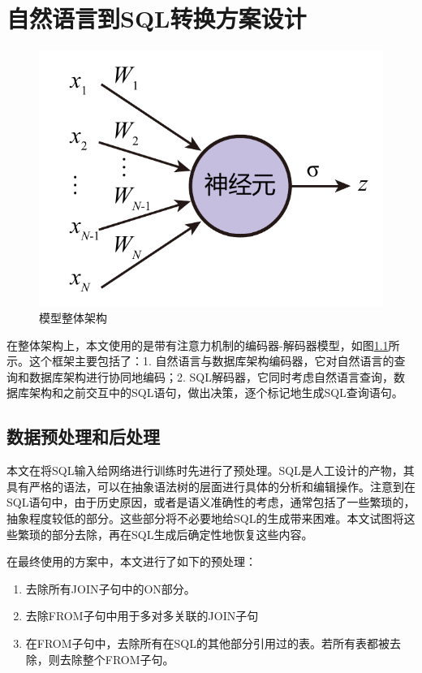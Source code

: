 \chapter{自然语言到SQL转换方案设计}

\begin{figure}[]
    \centering
    \includegraphics[page=6,width=\linewidth]{figure/figures.pdf}
    \caption{模型整体架构}
    \label{arch}
\end{figure}

在整体架构上，本文使用的是带有注意力机制的编码器-解码器模型，如图\ref{arch}所示。这个框架主要包括了：1. 自然语言与数据库架构编码器，它对自然语言的查询和数据库架构进行协同地编码；2. SQL解码器，它同时考虑自然语言查询，数据库架构和之前交互中的SQL语句，做出决策，逐个标记地生成SQL查询语句。

\section{数据预处理和后处理}

本文在将SQL输入给网络进行训练时先进行了预处理。SQL是人工设计的产物，其具有严格的语法，可以在抽象语法树的层面进行具体的分析和编辑操作。注意到在SQL语句中，由于历史原因，或者是语义准确性的考虑，通常包括了一些繁琐的，抽象程度较低的部分。这些部分将不必要地给SQL的生成带来困难。本文试图将这些繁琐的部分去除，再在SQL生成后确定性地恢复这些内容。

在最终使用的方案中，本文进行了如下的预处理：
\begin{enumerate}
    \item 去除所有JOIN子句中的ON部分。
    \item 去除FROM子句中用于多对多关联的JOIN子句
    \item 在FROM子句中，去除所有在SQL的其他部分引用过的表。若所有表都被去除，则去除整个FROM子句。
\end{enumerate}

